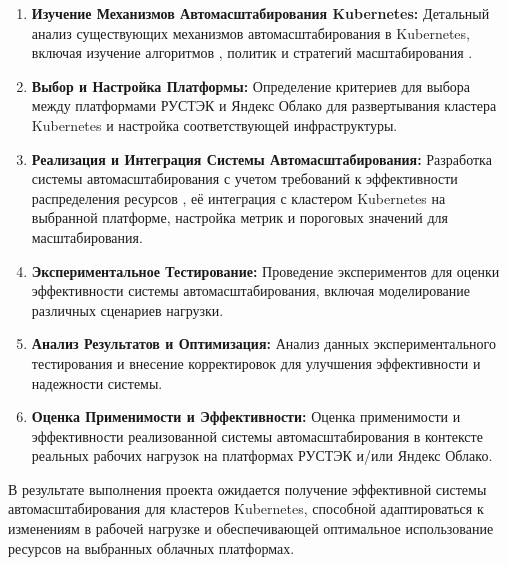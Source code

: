 \begin{enumerate}
 \item \textbf{Изучение Механизмов Автомасштабирования Kubernetes:} Детальный
анализ существующих механизмов автомасштабирования в Kubernetes, включая
изучение алгоритмов \cite{senjab2023survey}, политик и стратегий масштабирования 
\cite{tran2022survey, qu2018auto, millnert2020holoscale}.
 
 \item \textbf{Выбор и Настройка Платформы:} Определение критериев для выбора
между платформами РУСТЭК и Яндекс Облако для развертывания кластера Kubernetes и
настройка соответствующей инфраструктуры.
 
 \item \textbf{Реализация и Интеграция Системы Автомасштабирования:} Разработка
системы автомасштабирования с учетом требований к эффективности распределения ресурсов 
\cite{zhong2020cost}, её интеграция с кластером Kubernetes на выбранной
платформе, настройка метрик и пороговых значений для масштабирования.
 
 \item \textbf{Экспериментальное Тестирование:} Проведение экспериментов для
оценки эффективности системы автомасштабирования, включая моделирование
различных сценариев нагрузки.
 
 \item \textbf{Анализ Результатов и Оптимизация:} Анализ данных
экспериментального тестирования и внесение корректировок для улучшения
эффективности и надежности системы.
 
 \item \textbf{Оценка Применимости и Эффективности:} Оценка применимости и
эффективности реализованной системы автомасштабирования в контексте реальных
рабочих нагрузок на платформах РУСТЭК и/или Яндекс Облако.
\end{enumerate}

В результате выполнения проекта ожидается получение эффективной системы
автомасштабирования для кластеров Kubernetes, способной адаптироваться к
изменениям в рабочей нагрузке и обеспечивающей оптимальное использование
ресурсов на выбранных облачных платформах.
